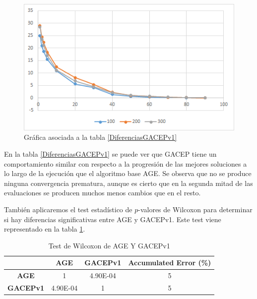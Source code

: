 \begin{figure}[h]
		\centering
		\includegraphics[scale=1]{imagenes/Experimental/DiferenciasGACEPv1.png}
        \caption{Gráfica asociada a la tabla \ref{DiferenciasGACEPv1}}
        \label{fig:DiferenciasGACEPv1}
\end{figure}

En la tabla \ref{DiferenciasGACEPv1} se puede ver que GACEP tiene un comportamiento similar con respecto a la progresión de las mejores soluciones a lo largo de la ejecución que el algoritmo base AGE. 
Se observa que no se produce ninguna convergencia prematura, aunque es cierto que en la segunda mitad de las evaluaciones se producen muchos menos cambios que en el resto. 

También aplicaremos el test estadístico de $p$-valores de Wilcoxon para determinar si hay diferencias significativas entre AGE y GACEPv1. 
Este test viene representado en la tabla \ref{WilcoxonGACEPv1}.

\begin{table}[h]
\begin{tabular}{c|c|c|c|}
\cline{2-4}
\multicolumn{1}{l|}{}                  & \textbf{AGE}                    & \textbf{GACEPv1}                & \textbf{Accumulated Error   (\%)} \\ \hline
\multicolumn{1}{|c|}{\textbf{AGE}}     & 1                               & {\color[HTML]{FF0000} 4.90E-04} & 5                                 \\ \hline
\multicolumn{1}{|c|}{\textbf{GACEPv1}} & {\color[HTML]{0000FF} 4.90E-04} & 1                               & 5                                 \\ \hline
\end{tabular}
\caption{\label{WilcoxonGACEPv1}Test de Wilcoxon de AGE Y GACEPv1}
\end{table}

